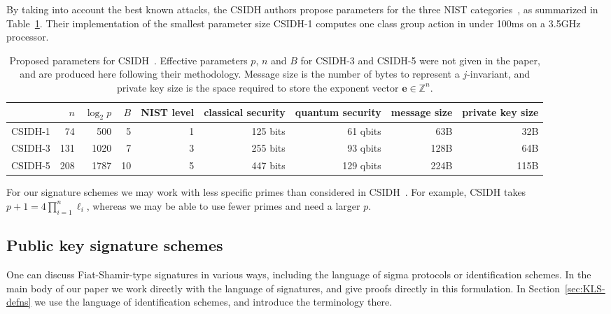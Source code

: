 \documentclass{llncs}
\newcommand{\Z}{\mathbb{Z}}
\newcommand{\e}{\mathbf{e}}
\begin{document}
By taking into account the best known attacks, the CSIDH authors propose parameters for the three NIST categories~\cite{NIST2016}, as summarized in Table~\ref{tab:csidh-parms}.
Their implementation of the smallest parameter size CSIDH-1 computes one class group action in under 100ms on a 3.5GHz processor.


\begin{table}
  \centering
  \begin{tabular}{l | r | r | r | r | r | r | r | r}
    & $n$ & $\log_2 p$ & $B$ & NIST level & classical security & quantum security & message size & private key size \\
    \hline
    CSIDH-1 &  74 &  500 &  5 & 1 & 125 bits &  61 qbits &  63B &  32B\\
    CSIDH-3 & 131 & 1020 &  7 & 3 & 255 bits &  93 qbits & 128B &  64B\\
    CSIDH-5 & 208 & 1787 & 10 & 5 & 447 bits & 129 qbits & 224B & 115B
  \end{tabular}
  \caption{Proposed parameters for CSIDH~\cite{CLMPR18}.  Effective
    parameters $p$, $n$ and $B$ for CSIDH-3 and CSIDH-5 were not given
    in the paper, and are produced here following their methodology.
    Message size is the number of bytes to represent a $j$-invariant, and private key size is the space required to store the exponent vector $\e \in \Z^n$.}
  \label{tab:csidh-parms}
\end{table}




For our signature schemes we may work with less specific primes than considered in CSIDH~\cite{CLMPR18}. For example, CSIDH takes $p+1 = 4\prod_{i=1}^n\ell_i$, whereas we may be able to use fewer primes and need a larger $p$.




\subsection{Public key signature schemes}

One can discuss Fiat-Shamir-type signatures in various ways, including the language of sigma protocols or identification schemes.
In the main body of our paper we work directly with the language of signatures, and give proofs directly in this formulation.
In Section~\ref{sec:KLS-defns} we use the language of identification schemes, and introduce the terminology there.
\end{document}
